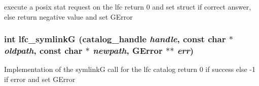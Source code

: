 execute a posix stat request on the lfc return 0 and set struct if correct answer, else return negative value and set GError 
\subsubsection{\setlength{\rightskip}{0pt plus 5cm}int lfc\_\-symlink\-G (catalog\_\-handle {\em handle}, const char $\ast$ {\em oldpath}, const char $\ast$ {\em newpath}, GError $\ast$$\ast$ {\em err})}\label{gfal__common__lfc_8c_28bfec8a5e66b63c082c444997ec5702}


Implementation of the symlink\-G call for the lfc catalog return 0 if success else -1 if error and set GError 
